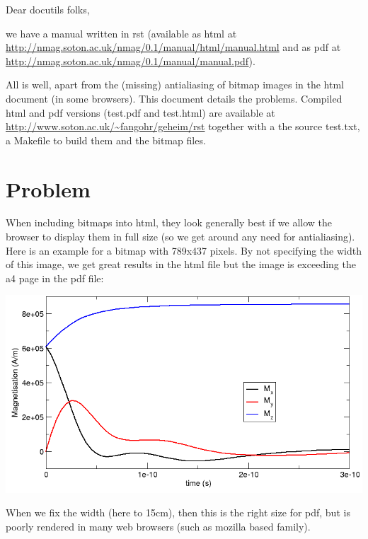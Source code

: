 \documentclass[10pt,a4paper,english]{article}
\title{}
\author{}
\date{}
\newlength{\locallinewidth}
\begin{document}
\setlength{\locallinewidth}{\linewidth}

Dear docutils folks,

we have a manual written in rst (available as html at
\href{http://nmag.soton.ac.uk/nmag/0.1/manual/html/manual.html}{http://nmag.soton.ac.uk/nmag/0.1/manual/html/manual.html} and as pdf at
\href{http://nmag.soton.ac.uk/nmag/0.1/manual/manual.pdf}{http://nmag.soton.ac.uk/nmag/0.1/manual/manual.pdf}).

All is well, apart from the (missing) antialiasing of bitmap images in
the html document (in some browsers). This document details the
problems. Compiled html and pdf versions (test.pdf and test.html) are
available at \href{http://www.soton.ac.uk/~fangohr/geheim/rst}{http://www.soton.ac.uk/{\textasciitilde}fangohr/geheim/rst} together with
a the source test.txt, a Makefile to build them and the bitmap files.



\hypertarget{problem}{}
\section*{Problem}

When including bitmaps into html, they look generally best if we allow
the browser to display them in full size (so we get around any need
for antialiasing). Here is an example for a bitmap with 789x437
pixels. By not specifying the width of this image, we get great
results in the html file but the image is exceeding the a4 page in the
pdf file:

{\hfill\includegraphics{data_M.png}\hfill}

When we fix the width (here to 15cm), then this is the right size for
pdf, but is poorly rendered in many web browsers (such as mozilla
based family).
\end{document}
